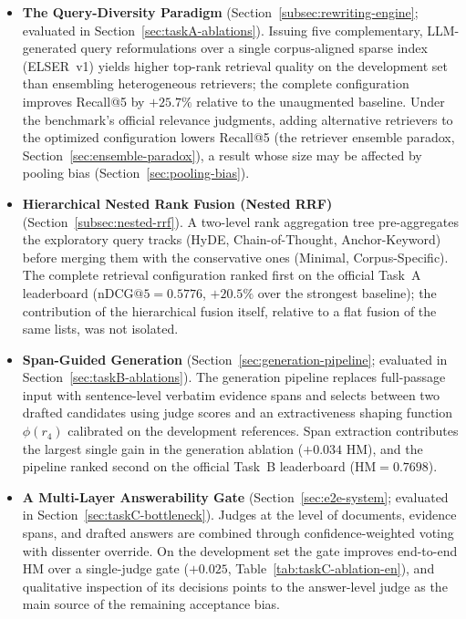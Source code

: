 \begin{itemize}
    \item \textbf{The Query-Diversity Paradigm} (Section~\ref{subsec:rewriting-engine}; evaluated in Section~\ref{sec:taskA-ablations}). Issuing five complementary, LLM-generated query reformulations over a single corpus-aligned sparse index (ELSER~v1) yields higher top-rank retrieval quality on the development set than ensembling heterogeneous retrievers; the complete configuration improves Recall@5 by $+25.7\%$ relative to the unaugmented baseline. Under the benchmark's official relevance judgments, adding alternative retrievers to the optimized configuration lowers Recall@5 (the retriever ensemble paradox, Section~\ref{sec:ensemble-paradox}), a result whose size may be affected by pooling bias (Section~\ref{sec:pooling-bias}).
    \item \textbf{Hierarchical Nested Rank Fusion (Nested RRF)} (Section~\ref{subsec:nested-rrf}). A two-level rank aggregation tree pre-aggregates the exploratory query tracks (HyDE, Chain-of-Thought, Anchor-Keyword) before merging them with the conservative ones (Minimal, Corpus-Specific). The complete retrieval configuration ranked first on the official Task~A leaderboard ($\text{nDCG@5}{=}0.5776$, $+20.5\%$ over the strongest baseline); the contribution of the hierarchical fusion itself, relative to a flat fusion of the same lists, was not isolated.
    \item \textbf{Span-Guided Generation} (Section~\ref{sec:generation-pipeline}; evaluated in Section~\ref{sec:taskB-ablations}). The generation pipeline replaces full-passage input with sentence-level verbatim evidence spans and selects between two drafted candidates using judge scores and an extractiveness shaping function $\phi(r_4)$ calibrated on the development references. Span extraction contributes the largest single gain in the generation ablation ($+0.034$ HM), and the pipeline ranked second on the official Task~B leaderboard ($\text{HM}{=}0.7698$).
    \item \textbf{A Multi-Layer Answerability Gate} (Section~\ref{sec:e2e-system}; evaluated in Section~\ref{sec:taskC-bottleneck}). Judges at the level of documents, evidence spans, and drafted answers are combined through confidence-weighted voting with dissenter override. On the development set the gate improves end-to-end HM over a single-judge gate ($+0.025$, Table~\ref{tab:taskC-ablation-en}), and qualitative inspection of its decisions points to the answer-level judge as the main source of the remaining acceptance bias.

\end{itemize}
